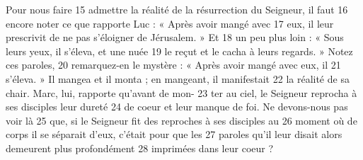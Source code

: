 Pour nous faire	 
15	 	admettre la réalité de la résurrection du Seigneur, il faut	 
16	 	encore noter ce que rapporte Luc : « Après avoir mangé avec	 
17	 	eux, il leur prescrivit de ne pas s'éloigner de Jérusalem. » Et	 
18	 	un peu plus loin : « Sous leurs yeux, il s'éleva, et une nuée	 
19	 	le reçut et le cacha à leurs regards. » Notez ces paroles,	 
20	 	remarquez-en le mystère : « Après avoir mangé avec eux, il	 
21	 	s'éleva. » Il mangea et il monta ; en mangeant, il manifestait	 
22	 	la réalité de sa chair. Marc, lui, rapporte qu'avant de mon-	 
23	 	ter au ciel, le Seigneur reprocha à ses disciples leur dureté	 
24	 	de coeur et leur manque de foi. Ne devons-nous pas voir là	 
25	 	que, si le Seigneur fit des reproches à ses disciples au	 
26	 	moment où de corps il se séparait d'eux, c'était pour que les	 
27	 	paroles qu'il leur disait alors demeurent plus profondément	 
28	 	imprimées dans leur coeur ?